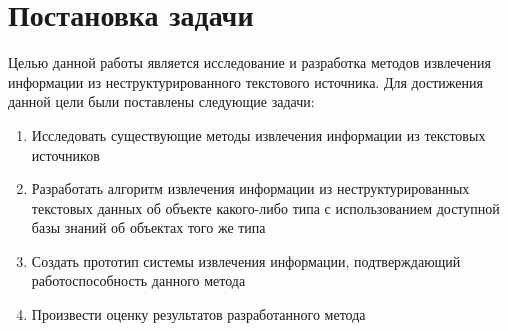 \chapter{Постановка задачи}

Целью данной работы является исследование и разработка методов извлечения информации из неструктурированного текстового источника. Для достижения данной цели были поставлены следующие задачи:

\begin{enumerate}
\item Исследовать существующие методы извлечения информации из текстовых источников
\item Разработать алгоритм извлечения информации из неструктурированных текстовых данных об объекте какого-либо типа с использованием доступной базы знаний об объектах того же типа
\item Создать прототип системы извлечения информации, подтверждающий работоспособность данного метода
\item Произвести оценку результатов разработанного метода 
\end{enumerate}
